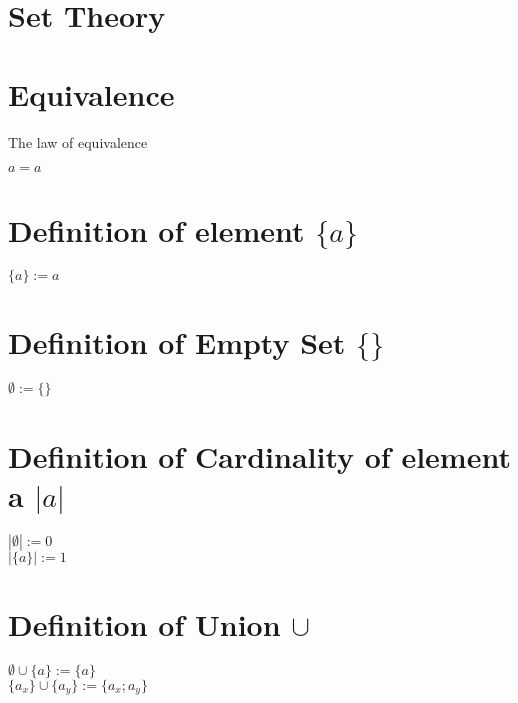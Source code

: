 \documentclass[11pt]{article}
\begin{document}
\section*{Set Theory}


\section{Equivalence}
The law of equivalence
\begin{center}
$
a = a
$
\end{center}


\section{Definition of element $\{a\}$}
\begin{center}
$
\{a\} := a
$
\\ \vspace{2mm}
\end{center}




\section{Definition of Empty Set $\{\}$}
\begin{center}
$
\emptyset := \{\}
$
\end{center}





\section{Definition of Cardinality of element a $|a|$}
\begin{center}
$
|\emptyset| := 0
$
\\ \vspace{2mm}
$
|\{a\}| := 1
$
\end{center}





\section{Definition of Union $\cup$}
\begin{center}
$
\emptyset \cup \{a\} := \{a\}
$
\\ \vspace{2mm}
$
\{a_x\}\cup \{a_y\} := \{a_x; a_y\}
$
\end{center}
\end{document}
